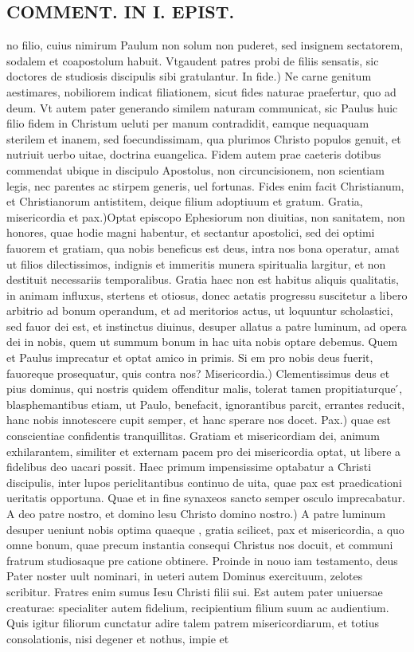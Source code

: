 \documentclass{article}
\begin{document}
\begin{pages}
\section*{COMMENT. IN I. EPIST. }
\marginpar{[ p.466 ]}\pstart no filio, cuius nimirum Paulum non solum non puderet, sed insignem sectatorem, sodalem et coapostolum habuit. Vtgaudent patres probi de filiis sensatis, sic doctores de studiosis discipulis sibi gratulantur. In fide.) Ne carne genitum aestimares, nobiliorem indicat filiationem, sicut fides naturae praefertur, quo ad deum. Vt autem pater generando similem naturam communicat, sic Paulus huic filio fidem in Christum ueluti per manum contradidit, eamque nequaquam sterilem et inanem, sed foecundissimam, qua plurimos Christo populos genuit, et nutriuit uerbo uitae, doctrina euangelica. Fidem autem prae caeteris dotibus commendat ubique  in discipulo Apostolus, non circuncisionem, non scientiam legis, nec parentes ac stirpem generis, uel fortunas. Fides enim facit Christianum, et Christianorum antistitem, deique filium adoptiuum et gratum. Gratia, misericordia et pax.)Optat episcopo Ephesiorum non diuitias, non sanitatem, non honores, quae hodie magni habentur, et sectantur apostolici, sed dei optimi fauorem et gratiam, qua nobis beneficus est deus, intra nos bona operatur, amat ut filios dilectissimos, indignis et immeritis munera spiritualia largitur, et non destituit necessariis temporalibus. Gratia haec non est habitus aliquis qualitatis, in animam influxus, stertens et otiosus, donec aetatis progressu suscitetur a libero arbitrio ad bonum operandum, et ad meritorios actus, ut loquuntur scholastici, sed fauor dei est, et instinctus diuinus, desuper allatus a patre luminum, ad opera dei in nobis, quem ut summum bonum in hac uita nobis optare debemus. Quem et Paulus imprecatur et optat amico in primis. Si em pro nobis deus fuerit, fauoreque prosequatur, quis contra nos? Misericordia.) Clementissimus deus et pius dominus, qui nostris quidem offenditur malis, tolerat tamen propitiaturque ́, blasphemantibus etiam, ut Paulo, benefacit, ignorantibus parcit, errantes reducit, hanc nobis innotescere cupit semper, et hanc sperare nos docet. Pax.) quae est conscientiae confidentis tranquillitas. Gratiam et misericordiam dei, animum exhilarantem, similiter et externam pacem pro dei misericordia optat, ut libere a fidelibus deo uacari possit. Haec primum impensissime optabatur a Christi discipulis, inter lupos periclitantibus continuo de uita, quae pax est praedicationi ueritatis opportuna. Quae et in fine synaxeos sancto semper osculo imprecabatur. A deo patre nostro, et domino lesu Christo domino nostro.) A patre luminum desuper ueniunt nobis optima quaeque , gratia scilicet, pax et misericordia, a quo omne bonum, quae precum instantia consequi Christus nos docuit, et communi fratrum studiosaque pre catione obtinere. Proinde in nouo iam testamento, deus Pater noster uult nominari, in ueteri autem Dominus exercituum, zelotes scribitur. Fratres enim sumus Iesu Christi filii sui. Est autem pater uniuersae creaturae: specialiter autem fidelium, recipientium filium suum ac audientium. Quis igitur filiorum cunctatur adire talem patrem misericordiarum, et totius consolationis, nisi degener et nothus, impie et 
\end{pages}
\end{document}
